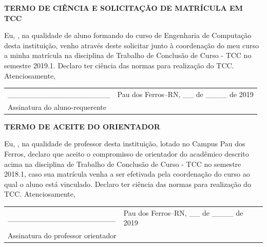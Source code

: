 \documentclass[12pt,openright,oneside,a4paper,ruledheader,pnumromarab,english]{abntex2}
\begin{document}
\vspace{0.25cm}
\hspace{-1.25cm}
\textbf{TERMO DE CIÊNCIA E SOLICITAÇÃO DE MATRÍCULA EM TCC}
\vspace{0.5cm}

\hspace{-1.25cm}Eu,\hspace{6cm} , na qualidade de aluno formando do curso de Engenharia de Computação desta instituição, venho através deste solicitar junto à coordenação do meu curso a minha matrícula na disciplina de Trabalho de Conclusão de Curso - TCC no semestre 2019.1. Declaro ter ciência das normas para realização do TCC. Atenciosamente,
\vspace{0.25cm}

\begin{table}[!htb]
\begin{tabular}{ll}
\multicolumn{1}{l}{\_\_\_\_\_\_\_\_\_\_\_\_\_\_\_\_\_\_\_} & Pau dos Ferros–RN, \_\_ de \_\_\_\_ de 2019 \\
Assinatura do aluno-requerente                                                                      &                                                            
\end{tabular}
\end{table}

\vspace{-.5cm}
\begin{center}
  \textbf{TERMO DE ACEITE DO ORIENTADOR}  
\end{center}

\vspace{-.25cm}
\hspace{-1.25cm}Eu, \hspace{6cm}, na qualidade de professor desta instituição, lotado no Campus Pau dos Ferros, declaro que aceito o compromisso de orientador do acadêmico descrito acima na disciplina de Trabalho de Conclusão de Curso - TCC no semestre 2018.1, caso sua matrícula venha a ser efetivada pela coordenação do curso ao qual o aluno está vinculado. Declaro ter ciência das normas para realização do TCC. Atenciosamente,

\begin{table}[!htb]
\begin{tabular}{ll}
\multicolumn{1}{l}{\_\_\_\_\_\_\_\_\_\_\_\_\_\_\_\_\_\_\_\_} & Pau dos Ferros–RN, \_\_ de \_\_\_\_ de 2019 \\
Assinatura do professor orientador                                                                     &                                                            
\end{tabular}
\end{table}
\end{document}
